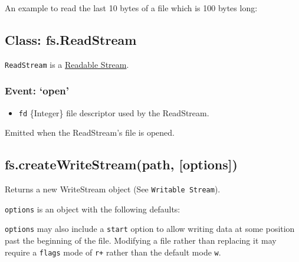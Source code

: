 An example to read the last 10 bytes of a file which is 100 bytes long:

\begin{Shaded}
\begin{Highlighting}[]
\NormalTok{(}\NormalTok{, \{}\NormalTok{: }\NormalTok{, }\NormalTok{: }\NormalTok{\});}
\end{Highlighting}
\end{Shaded}

\subsection{Class: fs.ReadStream}

\texttt{ReadStream} is a
\href{stream.html\#stream\_readable\_stream}{Readable Stream}.

\subsubsection{Event: `open'}

\begin{itemize}
\item
  \texttt{fd} \{Integer\} file descriptor used by the ReadStream.
\end{itemize}

Emitted when the ReadStream's file is opened.

\subsection{fs.createWriteStream(path, {[}options{]})}

Returns a new WriteStream object (See \texttt{Writable Stream}).

\texttt{options} is an object with the following defaults:

\begin{Shaded}
\begin{Highlighting}[]
\NormalTok{\{ }\NormalTok{: }\NormalTok{,}
  \NormalTok{: } \NormalTok{\}}
\end{Highlighting}
\end{Shaded}

\texttt{options} may also include a \texttt{start} option to allow
writing data at some position past the beginning of the file. Modifying
a file rather than replacing it may require a \texttt{flags} mode of
\texttt{r+} rather than the default mode \texttt{w}.

